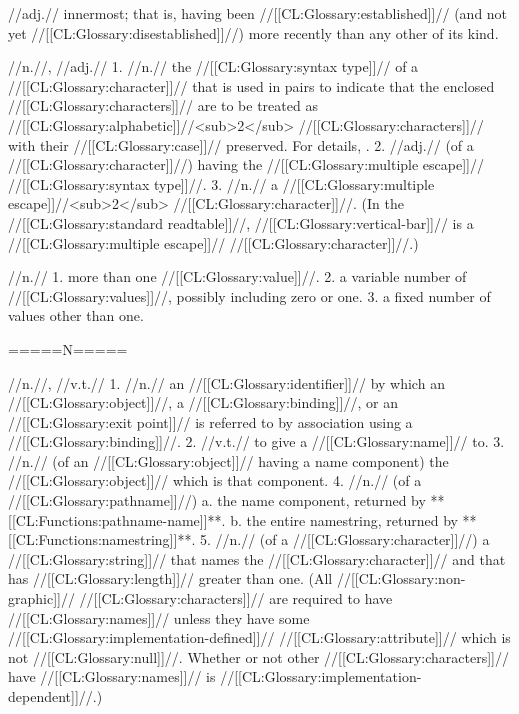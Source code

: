  //adj.// innermost; that is, having been //[[CL:Glossary:established]]// (and not yet //[[CL:Glossary:disestablished]]//) more recently than any other of its kind.

 //n.//, //adj.// 1. //n.// the //[[CL:Glossary:syntax type]]// of a //[[CL:Glossary:character]]// that is used in pairs to indicate that the enclosed //[[CL:Glossary:characters]]// are to be treated as //[[CL:Glossary:alphabetic]]//<sub>2</sub> //[[CL:Glossary:characters]]// with their //[[CL:Glossary:case]]// preserved. For details, \seesection\MultipleEscapeChar. 2. //adj.// (of a //[[CL:Glossary:character]]//) having the //[[CL:Glossary:multiple escape]]// //[[CL:Glossary:syntax type]]//. 3. //n.// a //[[CL:Glossary:multiple escape]]//<sub>2</sub> //[[CL:Glossary:character]]//. (In the //[[CL:Glossary:standard readtable]]//, //[[CL:Glossary:vertical-bar]]// is a //[[CL:Glossary:multiple escape]]// //[[CL:Glossary:character]]//.)

 //n.// 1. more than one //[[CL:Glossary:value]]//.  2. a variable number of //[[CL:Glossary:values]]//, possibly including zero or one.  3. a fixed number of values other than one. 

=====N=====
 
 //n.//, //v.t.// 1. //n.// an //[[CL:Glossary:identifier]]// by which an //[[CL:Glossary:object]]//, a //[[CL:Glossary:binding]]//, or an //[[CL:Glossary:exit point]]// is referred to by association using a //[[CL:Glossary:binding]]//. 2. //v.t.// to give a //[[CL:Glossary:name]]// to. 3. //n.// (of an //[[CL:Glossary:object]]// having a name component) the //[[CL:Glossary:object]]// which is that component.  4. //n.// (of a //[[CL:Glossary:pathname]]//) a. the name component, returned by **[[CL:Functions:pathname-name]]**. b. the entire namestring, returned by **[[CL:Functions:namestring]]**. 5. //n.// (of a //[[CL:Glossary:character]]//) a //[[CL:Glossary:string]]// that names the //[[CL:Glossary:character]]// and that has //[[CL:Glossary:length]]// greater than one. (All //[[CL:Glossary:non-graphic]]// //[[CL:Glossary:characters]]// are required to have //[[CL:Glossary:names]]// unless they have some //[[CL:Glossary:implementation-defined]]// //[[CL:Glossary:attribute]]// which is not //[[CL:Glossary:null]]//. Whether or not other //[[CL:Glossary:characters]]// have //[[CL:Glossary:names]]// is //[[CL:Glossary:implementation-dependent]]//.)

